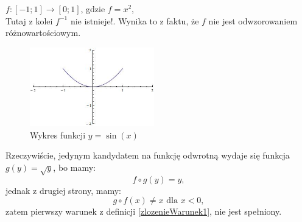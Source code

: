 \begin{przyklad}
$f: [-1;1] \rightarrow [0;1]$, gdzie $f = x^2$,
\\ Tutaj z kolei $f^{-1}$ nie istnieje!. Wynika to z faktu, że $f$ nie jest odwzorowaniem różnowartościowym.
\begin{figure}[H]%
  \begin{center}
    \includegraphics[width=0.48\textwidth]{./podrozdzial01-obrazki/4.jpeg}
  \end{center}
  \caption{Wykres funkcji $y=\sin(x)$}
\end{figure}
Rzeczywiście, jedynym kandydatem na funkcję odwrotną wydaje się funkcja $g(y) = \sqrt{y}$, bo mamy:
$$f \circ g (y) = y ,$$
jednak z drugiej strony, mamy:
$$ g \circ f (x) \neq x  \text{  dla  } x<0 ,$$
zatem pierwszy warunek z definicji \ref{zlozenieWarunek1}, nie jest spełniony.

\end{przyklad}




%
